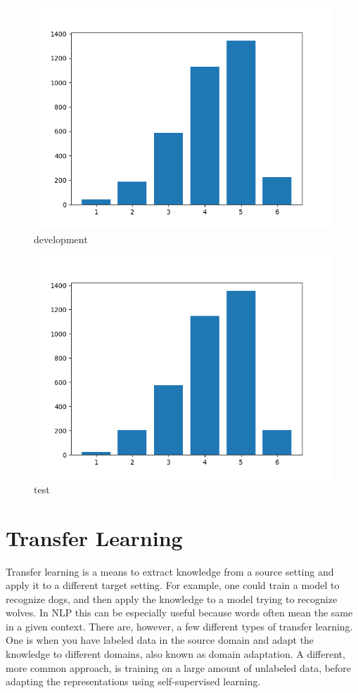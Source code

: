 \documentclass{report}
\begin{document}
\begin{figure}[h!]
		\centering
		\includegraphics[scale=0.5]{img/dev_ratings}
		\caption{development}
		\label{fig:devratings}
	\end{figure}%
\begin{figure}[h!]
		\centering
		\includegraphics[scale=0.5]{img/test_ratings}
		\caption{test}
		\label{fig:testratings}
\end{figure}%




\section{Transfer Learning}
Transfer learning is a means to extract knowledge from a source setting and apply it to a different target setting. For example, one could train a model to recognize dogs, and then apply the knowledge to a model trying to recognize wolves. In NLP this can be especially useful because words often mean the same in a given context. There are, however, a few different types of transfer learning. One is when you have labeled data in the source domain and adapt the knowledge to different domains, also known as domain adaptation. A different, more common approach, is training on a large amount of unlabeled data, before adapting the representations using self-supervised learning.
\end{document}
